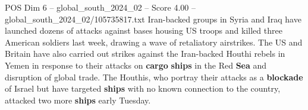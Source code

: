 \begin{textsample}{POS Dim 6 – global\_south\_2024\_02 – Score 4.00 – global\_south\_2024\_02/105735817.txt}
Iran-backed groups in Syria and Iraq have launched dozens of attacks against bases housing US troops and killed three American soldiers last week, drawing a wave of retaliatory airstrikes.
The US and Britain have also carried out strikes against the Iran-backed Houthi rebels in Yemen in response to their attacks on \textbf{cargo} \textbf{ships} in the Red \textbf{Sea} and disruption of global trade.
The Houthis, who portray their attacks as a \textbf{blockade} of Israel but have targeted \textbf{ships} with no known connection to the country, attacked two more \textbf{ships} early Tuesday.

\end{textsample}
